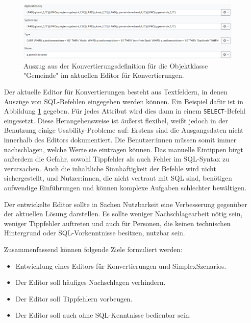 \begin{figure}[ht]
  \centering
  \includegraphics[width=.95\textwidth]{assets/conversion-gemeinde.png}
  \caption{Auszug aus der Konvertierungsdefinition für die Objektklasse "Gemeinde" im aktuellen Editor für Konvertierungen.}
  \label{fig:conversion-gemeinde}
\end{figure}

Der aktuelle Editor für Konvertierungen besteht aus Textfeldern, in denen Auszüge von \ac{SQL}-Befehlen eingegeben werden können. Ein Beispiel dafür ist in Abbildung \ref{fig:conversion-gemeinde} gegeben. Für jedes Attribut wird dies dann in einem \texttt{SELECT}-Befehl eingesetzt. Diese Herangehensweise ist äußerst flexibel, weißt jedoch in der Benutzung einige Usability-Probleme auf: Erstens sind die Ausgangsdaten nicht innerhalb des Editors dokumentiert. Die Benutzer:innen müssen somit immer nachschlagen, welche Werte sie eintragen können. Das manuelle Eintippen birgt außerdem die Gefahr, sowohl Tippfehler als auch Fehler im \ac{SQL}-Syntax zu verursachen. Auch die inhaltliche Sinnhaftigkeit der Befehle wird nicht sichergestellt, und Nutzer:innen, die nicht vertraut mit SQL sind, benötigen aufwendige Einführungen und können komplexe Aufgaben schlechter bewältigen. 

Der entwickelte Editor sollte in Sachen Nutzbarkeit eine Verbesserung gegenüber der aktuellen Lösung darstellen. Es sollte weniger Nachschlagearbeit nötig sein, weniger Tippfehler auftreten und auch für Personen, die keinen technischen Hintergrund oder \ac{SQL}-Vorkenntnisse besitzen, nutzbar sein.

Zusammenfassend können folgende Ziele formuliert werden:
\begin{itemize}
  \item Entwicklung eines Editors für Konvertierungen und SimplexSzenarios.
  \item Der Editor soll häufiges Nachschlagen verhindern.
  \item Der Editor soll Tippfehlern vorbeugen.
  \item Der Editor soll auch ohne \ac{SQL}-Kenntnisse bedienbar sein.
\end{itemize}
